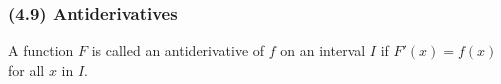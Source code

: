 \begin{frame}
\frametitle{(4.9) Antiderivatives}
\begin{definition}[Antiderivative]
A function $F$ is called an antiderivative of $f$ on an interval $I$ if $F'(x) = f(x)$ for all $x$ in $I$.
\end{definition}
\end{frame}
